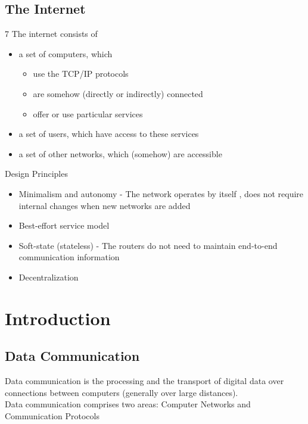 \documentclass[11pt,ngerman]{article}
\begin{document}
\subsection{The Internet}7
The internet consists of
\begin{itemize}
	\item a	set	of	computers,	which
	\begin{itemize}
		\item use	the	TCP/IP	protocols
		\item are	somehow	(directly	or	indirectly)	connected
		\item offer	or	use	particular	services
	\end{itemize}
	\item a	set	of	users,	which	have	access	to	these	services
	\item a	set	of	other	networks,	which	(somehow)	are	accessible
\end{itemize}

Design Principles
\begin{itemize}
	\item Minimalism	and	autonomy  - The	network	operates	by	itself	, does	not	require	internal	changes	when	new	networks	are	added
	\item Best-effort	service	model
	\item Soft-state	(stateless) - The	routers	do	not need	to	maintain end-to-end	communication	
information
	\item Decentralization
\end{itemize}






\section{Introduction}
\subsection{Data	Communication}
Data	communication	is	the	processing	and	the	transport	of	digital	data	over	
connections	between	computers	(generally	over	large	distances).\\
Data	communication	comprises	two areas: Computer	Networks and Communication	Protocols
\end{document}
